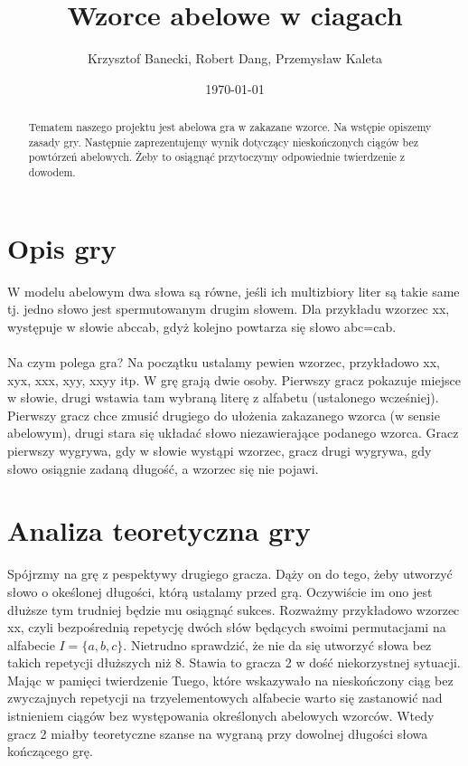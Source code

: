 \documentclass[12pt,a4paper]{amsart}
\begin{document}
\title{Wzorce abelowe w ciagach}
\author{Krzysztof Banecki, Robert Dang, Przemysław Kaleta}
\date{\today}
\maketitle

\begin{abstract}
Tematem naszego projektu jest abelowa gra w zakazane wzorce. Na wstępie opiszemy zasady gry. Następnie zaprezentujemy wynik dotyczący nieskończonych ciągów bez powtórzeń abelowych. Żeby to osiągnąć przytoczymy odpowiednie twierdzenie z dowodem.
\end{abstract}

\section{Opis gry}
W modelu abelowym dwa słowa są równe, jeśli ich multizbiory liter są takie same tj. jedno słowo jest spermutowanym drugim słowem. Dla przykładu wzorzec xx, występuje w słowie abccab, gdyż kolejno powtarza się słowo abc=cab.\\
\\
Na czym polega gra? Na początku ustalamy pewien wzorzec, przykładowo xx, xyx, xxx, xyy, xxyy itp. W grę grają dwie osoby. Pierwszy gracz pokazuje miejsce w słowie, drugi wstawia tam wybraną literę z alfabetu (ustalonego wcześniej). Pierwszy gracz chce zmusić drugiego do ułożenia zakazanego wzorca (w sensie abelowym), drugi stara się układać słowo niezawierające podanego wzorca. Gracz pierwszy wygrywa, gdy w słowie wystąpi wzorzec, gracz drugi wygrywa, gdy słowo osiągnie zadaną długość, a wzorzec się nie pojawi.

\section{Analiza teoretyczna gry}
Spójrzmy na grę z pespektywy drugiego gracza. Dąży on do tego, żeby utworzyć słowo o okeślonej długości, którą ustalamy przed grą. Oczywiście im ono jest dłuższe tym trudniej będzie mu osiągnąć sukces. Rozważmy przykładowo wzorzec xx, czyli bezpośrednią repetycję dwóch słów będących swoimi permutacjami na alfabecie $I=\{a,b,c\}$. Nietrudno sprawdzić, że nie da się utworzyć słowa bez takich repetycji dłuższych niż 8. Stawia to gracza 2 w dość niekorzystnej sytuacji. Mając w pamięci twierdzenie Tuego, które wskazywało na nieskończony ciąg bez zwyczajnych repetycji na trzyelementowych alfabecie warto się zastanowić nad istnieniem ciągów bez występowania określonych abelowych wzorców. Wtedy gracz 2 miałby teoretyczne szanse na wygraną przy dowolnej długości słowa kończącego grę.\\
\end{document}
